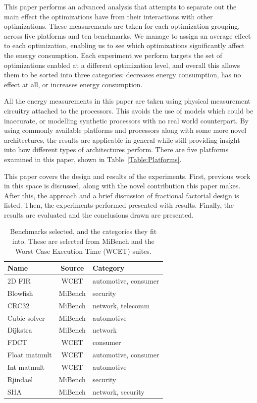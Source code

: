 \documentclass[twocolumn]{article}
\let\oldcaption\caption
\renewcommand{\caption}[1]{\oldcaption{\textup{#1}}}
\begin{document}
This paper performs an advanced analysis that attempts to separate out the main effect the optimizations have from their interactions with other optimizations. These measurements are taken for each optimization grouping, across five platforms and ten benchmarks. We manage to assign an average effect to each optimization, enabling us to see which optimizations significantly affect the energy consumption. Each experiment we perform targets the set of optimizations enabled at a different optimization level, and overall this allows them to be sorted into three categories: decreases energy consumption, has no effect at all, or increases energy consumption.

All the energy measurements in this paper are taken using physical measurement circuitry attached to the processors. This avoids the use of models which could be inaccurate, or modelling synthetic processors with no real world counterpart. By using commonly available platforms and processors along with some more novel architectures, the results are applicable in general while still providing insight into how different types of architectures perform. There are five platforms examined in this paper, shown in Table~\ref{Table:Platforms}.

This paper covers the design and results of the experiments. First, previous work in this space is discussed, along with the novel contribution this paper makes. After this, the approach and a brief discussion of fractional factorial design is listed. Then, the experiments performed presented with results. Finally, the results are evaluated and the conclusions drawn are presented.


\begin{table}[t]
	\centering
	\begin{tabular}{l c l}
	\textbf{Name}			& \textbf{Source} 	& \textbf{Category} \\
	\hline
	2D FIR					& WCET 		& automotive, consumer	\\
	Blowfish				& MiBench 	& security	\\
	CRC32					& MiBench 	& network, telecomm	\\
	Cubic solver			& MiBench 	& automotive	\\
	Dijkstra				& MiBench 	& network	\\
	FDCT					& WCET 		& consumer	\\
	Float matmult			& WCET 		& automotive, consumer	\\
	Int matmult				& WCET	 	& automotive	\\
	Rjindael				& MiBench 	& security	\\
	SHA						& MiBench 	& network, security	\\
	\end{tabular}
\caption{Benchmarks selected, and the categories they fit into. These are selected from MiBench\cite{MiBench} and the Worst Case Execution Time (WCET)\cite{WCET} suites.}
\label{Table:Benchmarks}
\end{table}
\end{document}
